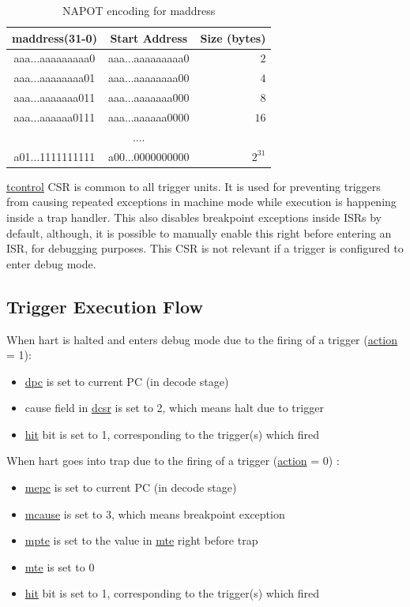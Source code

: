 \documentclass[main\_\_EN.tex]{subfiles}
\begin{document}
\begin{longtable}{ | c | c | r | }
\caption{NAPOT encoding for maddress} \label{tab:riscvcpu-hwt-table}
\\ \hline
\rowcolor{lightgray}
maddress(31-0) & Start Address & Size (bytes) \\ \hline
aaa...aaaaaaaaa0 & aaa...aaaaaaaaa0 & $2$ \\ \hline
aaa...aaaaaaaa01 & aaa...aaaaaaaa00 & $4$ \\ \hline
aaa...aaaaaaa011 & aaa...aaaaaaa000 & $8$ \\ \hline
aaa...aaaaaa0111 & aaa...aaaaaa0000 & $16$ \\ \hline
\multicolumn{3}{c}{....} \\ \hline
a01...1111111111 & a00...0000000000 & $2^{31}$ \\ \hline
\end{longtable}

\hyperref[regdesc:TCONTROL]{tcontrol} CSR is common to all trigger units. It is used for preventing triggers from causing repeated exceptions in machine mode while execution is happening inside a trap handler. This also disables breakpoint exceptions inside ISRs by default, although, it is possible to manually enable this right before entering an ISR, for debugging purposes. This CSR is not relevant if a trigger is configured to enter debug mode.

\subsection{Trigger Execution Flow}
\label{sec:riscvcpu-hwt-suggest-op}

When hart is halted and enters debug mode due to the firing of a trigger (\hyperref[fielddesc:MCONTROLACTION]{action} = 1):
\begin{itemize}
    \item \hyperref[regdesc:DPC]{dpc} is set to current PC (in decode stage)
    \item cause field in \hyperref[regdesc:DCSR]{dcsr} is set to 2, which means halt due to trigger
    \item \hyperref[fielddesc:MCONTROLHIT]{hit} bit is set to 1, corresponding to the trigger(s) which fired
\end{itemize}

When hart goes into trap due to the firing of a trigger (\hyperref[fielddesc:MCONTROLACTION]{action} = 0) :
\begin{itemize}
    \item \hyperref[regdesc:MEPC]{mepc} is set to current PC (in decode stage)
    \item \hyperref[regdesc:MCAUSE]{mcause} is set to 3, which means breakpoint exception
    \item \hyperref[fielddesc:TCONTROLMPTE]{mpte} is set to the value in \hyperref[fielddesc:TCONTROLMTE]{mte} right before trap
    \item \hyperref[fielddesc:TCONTROLMTE]{mte} is set to 0
    \item \hyperref[fielddesc:MCONTROLHIT]{hit} bit is set to 1, corresponding to the trigger(s) which fired
\end{itemize}
\end{document}
